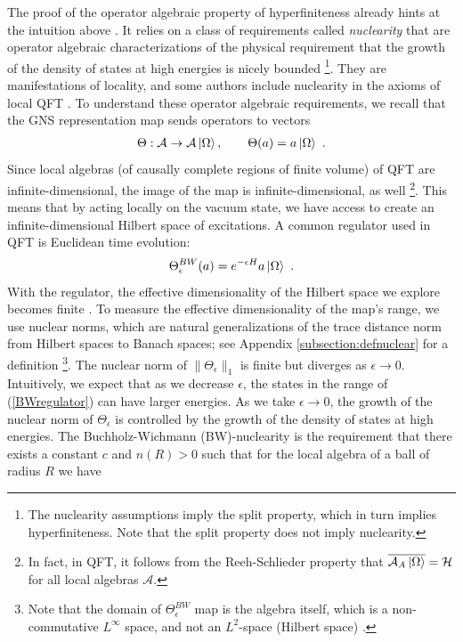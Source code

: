 \documentclass[a4paper,11pt]{article}
\theoremstyle{definition}
\newcommand{\mA}{\mathcal{A}}
\newcommand{\ep}{\epsilon}
\begin{document}
The proof of the operator algebraic property of hyperfiniteness already hints at the intuition above \cite{buchholz1987universal}. It relies on a class of requirements called {\it nuclearity} that are operator algebraic characterizations of the physical requirement that the growth of the density of states at high energies is nicely bounded \cite{buchholz1986causal}\footnote{The nuclearity assumptions imply the split property, which in turn implies hyperfiniteness. Note that the split property does not imply nuclearity.}. They are manifestations of locality, and some authors include nuclearity in the axioms of local QFT \cite{hollands2018entanglement}. To understand these operator algebraic requirements, we recall that the GNS representation map sends operators to vectors
\begin{eqnarray}
    \Theta:\mA\to \mA\ket{\Omega}, \qquad \Theta(a)=a\ket{\Omega}\ .
\end{eqnarray}
Since local algebras (of causally complete regions of finite volume) of QFT are infinite-dimensional, the image of the map is infinite-dimensional, as well \footnote{In fact, in QFT, it follows from the Reeh-Schlieder property that $\overline{\mA_A\ket{\Omega}}=\mathcal{H}$ for all local algebras $\mA$.}. This means that by acting locally on the vacuum state, we have access to create an infinite-dimensional Hilbert space of excitations. A common regulator used in QFT is Euclidean time evolution:
\begin{eqnarray}\label{BWregulator}
    \Theta^{BW}_\ep(a)=e^{-\ep H}a\ket{\Omega}\ .
\end{eqnarray}
With the regulator, the effective dimensionality of the Hilbert space we explore becomes finite \cite{haag2012local}. To measure the effective dimensionality of the map's range, we use nuclear norms, which are natural generalizations of the trace distance norm from Hilbert spaces to Banach spaces; see Appendix \ref{subsection:defnuclear} for a definition \footnote{Note that the domain of $\Theta^{BW}_\ep$ map is the algebra itself, which is a non-commutative $L^\infty$ space, and not an $L^2$-space (Hilbert space) \cite{furuya2023monotonic}.}. The nuclear norm of $\|\Theta_\ep\|_1$ is finite but diverges as $\ep\to 0$. Intuitively, we expect that as we decrease $\ep$, the states in the range of (\ref{BWregulator}) can have larger energies. As we take $\ep\to 0$, the growth of the nuclear norm of $\Theta_\ep$ is controlled by the growth of the density of states at high energies. The Buchholz-Wichmann (BW)-nuclearity \cite{buchholz1986causal} is the requirement that there exists a constant $c$ and $n(R)>0$ such that for the local algebra of a ball of radius $R$ we have
\end{document}

